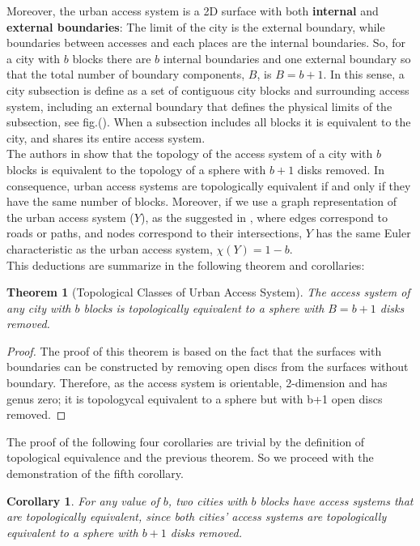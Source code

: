 \documentclass[10pt]{article}
\newtheorem{theorem}{Theorem}
\newtheorem{corollary}{Corollary}[theorem]
\begin{document}
Moreover, the urban access system is a 2D surface with both \textbf{internal} and \textbf{external boundaries}: The limit of the city is the external boundary, while boundaries between accesses and each places are the internal boundaries. So, for a city with $b$ blocks there are $b$ internal boundaries and one external boundary so that the total number of boundary components, $B$, is $B = b+1$. In this sense, a city subsection is define as a set of contiguous city blocks and surrounding access system, including an external boundary that defines the physical limits of the subsection, see fig.(). When a subsection includes all blocks it is equivalent to the city, and shares its entire access system.\\


The authors in \cite{bre} show that the topology of  the access system of a city with $b$ blocks is equivalent to the topology of a sphere with $b+1$ disks removed. In consequence, urban access systems are topologically equivalent if and only if they have the same number of blocks. Moreover, if we use a graph representation of the urban access system ($Y$), as the suggested in \cite{por}, where edges correspond to roads or paths, and nodes correspond to their intersections, $Y$ has the same Euler characteristic as the urban access system, $\chi(Y) = 1 - b$.\\

This deductions are summarize in the following theorem and corollaries:\\
\begin{theorem}[Topological Classes of Urban Access System]
The access system of any city with $b$ blocks is topologically equivalent to a sphere with $B=b+1$ disks removed.
\end{theorem}
\begin{proof}
The proof of this theorem is based on the fact that the surfaces with boundaries can be constructed by removing open discs from the surfaces without boundary. Therefore, as the access system is orientable, 2-dimension and has genus zero; it is topologycal equivalent to a sphere but with b+1 open discs removed. 
\end{proof}

The proof of the following four corollaries are trivial by the definition of topological equivalence and the previous theorem. So we proceed with the demonstration of the fifth corollary.

\begin{corollary}
    For any value of $b$, two cities with $b$ blocks have access systems that are topologically equivalent, since both cities’ access systems are topologically equivalent to a sphere with $b+1$ disks removed.
\end{corollary}
\end{document}
